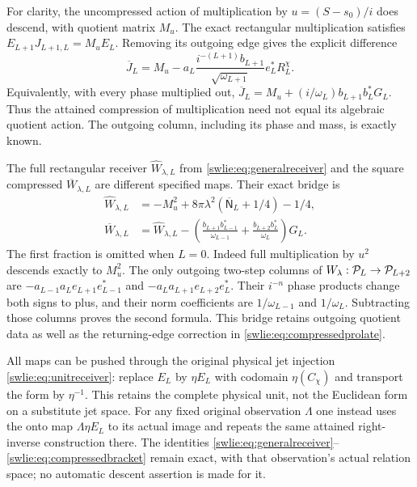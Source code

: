 For clarity, the uncompressed action of multiplication
by $u=(S-s_0)/i$ does descend, with quotient matrix $M_u$.
The exact rectangular multiplication satisfies
$E_{L+1}J_{L+1,L}=M_uE_L$. Removing its outgoing
edge gives the explicit difference
\begin{equation}\label{swlie:eq:Jquotient}
 \overline J_L=M_u-a_L
       \frac{i^{-(L+1)}b_{L+1}}{\sqrt{\omega_{L+1}}}
                                  e_L^*R_L^\chi.
\end{equation}
Equivalently, with every phase multiplied out,
$\overline J_L=M_u+(i/\omega_L)b_{L+1}b_L^*G_L$.
Thus the attained compression of multiplication need
not equal its algebraic quotient action. The outgoing
column, including its phase and mass, is exactly known.

The full rectangular receiver $\widehat W_{\lambda,L}$
from \eqref{swlie:eq:generalreceiver} and the square compressed
$\overline W_{\lambda,L}$ are different specified maps.
Their exact bridge is
\begin{equation}\label{swlie:eq:fullcompbridge}
 \begin{aligned}
 \widehat W_{\lambda,L}
   &=-M_u^2+8\pi\lambda^2(\overline{\mathsf N}_L+1/4)-1/4,\\
 \overline W_{\lambda,L}
   &=\widehat W_{\lambda,L}
     -\left(\frac{b_{L+1}b_{L-1}^*}{\omega_{L-1}}
             +\frac{b_{L+2}b_L^*}{\omega_L}\right)G_L .
 \end{aligned}
\end{equation}
The first fraction is omitted when $L=0$.
Indeed full multiplication by $u^2$ descends exactly to
$M_u^2$. The only outgoing two-step columns of
$W_\lambda:\mathcal P_L\to\mathcal P_{L+2}$ are
$-a_{L-1}a_Le_{L+1}e_{L-1}^*$
and $-a_La_{L+1}e_{L+2}e_L^*$.
Their $i^{-n}$ phase products change both signs to plus,
and their norm coefficients are $1/\omega_{L-1}$ and
$1/\omega_L$. Subtracting those columns proves the
second formula. This bridge retains outgoing quotient
data as well as the returning-edge correction in
\eqref{swlie:eq:compressedprolate}.

All maps can be pushed through the original physical
jet injection \eqref{swlie:eq:unitreceiver}: replace $E_L$
by $\eta E_L$ with codomain $\eta(C_\chi)$ and transport
the form by $\eta^{-1}$. This retains the complete
physical unit, not the Euclidean form on a substitute
jet space. For any fixed original observation $\Lambda$
one instead uses the onto map $\Lambda\eta E_L$
to its actual image and repeats the same attained
right-inverse construction there. The identities
\eqref{swlie:eq:generalreceiver}--\eqref{swlie:eq:compressedbracket}
remain exact, with that observation's actual relation
space; no automatic descent assertion is made for it.

